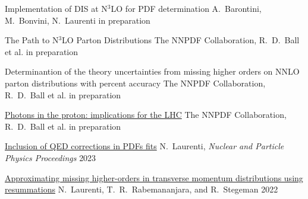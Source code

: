 
\begin{cvpublications}

    \cvpublication
    {Implementation of DIS at N$^3$LO for PDF determination} %
    {A.\ Barontini, M.\ Bonvini, N.\ Laurenti} %
    {in preparation}
    
    \cvpublication
    {The Path to N$^3$LO Parton Distributions} %
    {The NNPDF Collaboration, R.\ D.\ Ball et al.} %
    {in preparation}
    
    \cvpublication
    {Determinantion of the theory uncertainties from missing higher orders on NNLO parton distributions with percent accuracy} %
    {The NNPDF Collaboration, R.\ D.\ Ball et al.} %
    {in preparation}
    
    \cvpublication
    {\href{https://arxiv.org/pdf/2401.08749.pdf}{Photons in the proton: implications for the LHC}} %
    {The NNPDF Collaboration, R.\ D.\ Ball et al.} %
    {in preparation}

    \cvpublication
    {\href{https://doi.org/10.1016/j.nuclphysbps.2023.11.013}{Inclusion of QED corrections in PDFs ﬁts}}
    {N.\ Laurenti, \textit{Nuclear and Particle Physics Proceedings}}
    {2023}
    
    \cvpublication
    {\href{https://arxiv.org/abs/2207.12265}{Approximating missing higher-orders in transverse momentum distributions using resummations}}
    {N.\ Laurenti, T.\ R.\ Rabemananjara, and R.\ Stegeman}
    {2022}

\end{cvpublications}